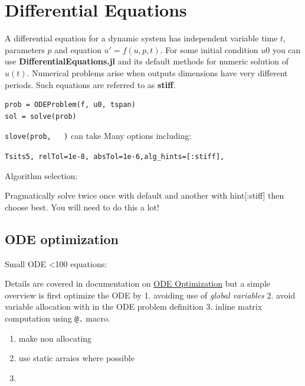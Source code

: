 \section{Differential Equations}
A differential equation for a dynamic system has independent variable time $t$, parameters $p$  and equation  $ u' = f(u,p,t)$.
 For some initial condition $u0$ you can use {\bf DifferentialEquations.jl} and its default methods for numeric solution of $u(t)$. Numerical problems arise when outputs dimensions have very different periods. Such equations are referred to as {\bf stiff}. 


\begin{verbatim}
prob = ODEProblem(f, u0, tspan)
sol = solve(prob)
\end{verbatim}
 \verb#slove(prob,   )# can take Many options including:
 
\noindent\verb#Tsits5, relTol=1e-8, absTol=1e-6,alg_hints=[:stiff], #
 
Algorithm selection: 

Pragmatically solve twice once with default and another with hint[:stiff] then choose best. You will need to do  this a lot!

\subsection{ODE optimization}
Small ODE <100 equations:

Details are covered in documentation on \href{https://tutorials.sciml.ai/html/introduction/03-optimizing_diffeq_code.html}{ODE Optimization} but a simple overview is
 first optimize the ODE by 1. avoiding use of \emph{global variables} 2. avoid  variable allocation with in the ODE problem definition 3. inline matrix computation using \verb#@.# macro. 
 
 \begin{enumerate}
 \item make non allocating
 \item use static arraies where possible
 \item
 \end{enumerate}
 
